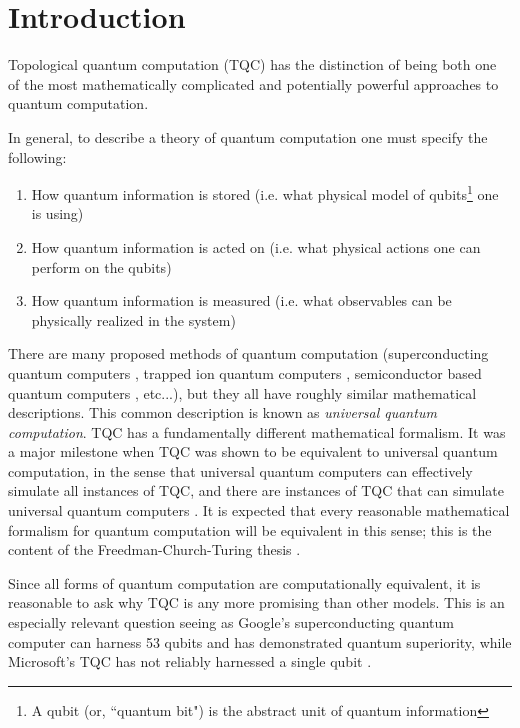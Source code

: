 \documentclass{article}
\theoremstyle{definition}
\numberwithin{figure}{section}
\begin{document}
\section{Introduction}
\label{Introduction}

Topological quantum computation (TQC) has the distinction of being both one of the most mathematically complicated and potentially powerful approaches to quantum computation.

In general, to describe a theory of quantum computation one must specify the following:

\begin{enumerate}
\item How quantum information is stored (i.e. what physical model of qubits\footnote{A qubit (or, ``quantum bit") is the abstract unit of quantum information} one is using)
\item How quantum information is acted on (i.e. what physical actions one can perform on the qubits)
\item How quantum information is measured (i.e. what observables can be physically realized in the system)
\end{enumerate}


There are many proposed methods of quantum computation (superconducting quantum computers \cite{wendin2017quantum}, trapped ion quantum computers \cite{debnath2016demonstration}, semiconductor based quantum computers \cite{kane1998silicon}, etc...), but they all have roughly similar mathematical descriptions. This common description is known as \textit{universal quantum computation}. TQC has a fundamentally different mathematical formalism. It was a major milestone when TQC was shown to be equivalent to universal quantum computation, in the sense that universal quantum computers can effectively simulate all instances of TQC, and there are instances of TQC that can simulate universal quantum computers  \cite{freedman2002modular, freedman2002simulation}. It is expected that every reasonable mathematical formalism for quantum computation will be equivalent in this sense; this is the content of the Freedman-Church-Turing thesis \cite{freedman2003topological}.

Since all forms of quantum computation are computationally equivalent, it is reasonable to ask why TQC is any more promising than other models. This is an especially relevant question seeing as Google's superconducting quantum computer can harness 53 qubits and has demonstrated quantum superiority, while Microsoft's TQC has not reliably harnessed a single qubit \cite{arute2019quantum}.
\end{document}
